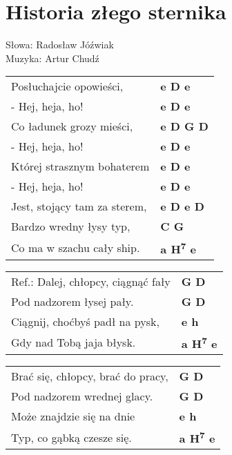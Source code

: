 \section{Historia złego sternika}

Słowa: Radosław Jóźwiak\\
Muzyka: Artur Chudź

\vspace{2em}
\begin{tabular}{@{}p{7cm}@{}l@{}}
Posłuchajcie opowieści,  & \bfseries   e D e \\
- Hej, heja, ho!  & \bfseries   e D e \\
Co ładunek grozy mieści,  & \bfseries   e D G D \\
- Hej, heja, ho!  & \bfseries   e D e \\
Której strasznym bohaterem  & \bfseries   e D e \\
- Hej, heja, ho!  & \bfseries   e D e \\
Jest, stojący tam za sterem,  & \bfseries   e D e D \\
Bardzo wredny łysy typ,  & \bfseries   C G \\
Co ma w szachu cały ship.  & \bfseries   a H\textsuperscript{7} e \\
\end{tabular}

\vspace{1em}
\begin{tabular}{@{}p{7cm}@{}l@{}}
Ref.: Dalej, chłopcy, ciągnąć fały  & \bfseries   G D \\
Pod nadzorem łysej pały.  & \bfseries   G D \\
Ciągnij, choćbyś padł na pysk,  & \bfseries   e h \\
Gdy nad Tobą jaja błysk.  & \bfseries   a H\textsuperscript{7} e \\
\end{tabular}

\vspace{1em}
\begin{tabular}{@{}p{7cm}@{}l@{}}
Brać się, chłopcy, brać do pracy,  & \bfseries   G D \\
Pod nadzorem wrednej glacy.  & \bfseries   G D \\
Może znajdzie się na dnie  & \bfseries   e h \\
Typ, co gąbką czesze się.  & \bfseries   a H\textsuperscript{7} e \\
\end{tabular}

